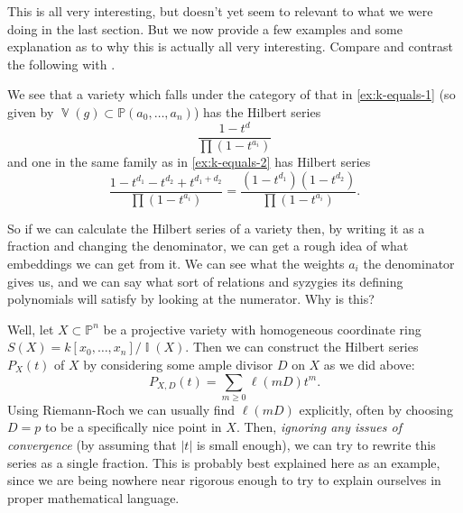 \documentclass[10pt,notitlepage]{article}
\numberwithin{equation}{subsection}
\DeclareMathOperator{\van}{\mathbb{V}}
\DeclareMathOperator{\ide}{\mathbb{I}}
\newcommand{\pee}{\mathbb{P}}
\newcommand{\pazn}{\pee(a_0,\ldots,a_n)}
\begin{document}
        This is all very interesting, but doesn't yet seem to relevant to what we were doing in the last section.
        But we now provide a few examples and some explanation as to why this is actually all very interesting.
        Compare and contrast the following with \cite[Proposition~4.3,~Example~4.4]{Reid:2002uy}.

        \begin{example}
            We see that a variety which falls under the category of that in \cref{ex:k-equals-1} (so given by $\van(g)\subset\pazn$) has the Hilbert series
            \[
                \frac{1-t^d}{\prod(1-t^{a_i})}
            \]
            and one in the same family as in \cref{ex:k-equals-2} has Hilbert series
            \[
                \frac{1-t^{d_1}-t^{d_2}+t^{d_1+d_2}}{\prod(1-t^{a_i})} = \frac{(1-t^{d_1})(1-t^{d_2})}{\prod(1-t^{a_i})}.
            \]
        \end{example}

        So if we can calculate the Hilbert series of a variety then, by writing it as a fraction and changing the denominator, we can get a rough idea of what embeddings we can get from it.
        We can see what the weights $a_i$ the denominator gives us, and we can say what sort of relations and syzygies its defining polynomials will satisfy by looking at the numerator.
        Why is this?

        Well, let $X\subset\pee^n$ be a projective variety with homogeneous coordinate ring $S(X)=k[x_0,\ldots,x_n]/\ide(X)$.
        Then we can construct the Hilbert series $P_X(t)$ of $X$ by considering some ample divisor $D$ on $X$ as we did above:
        \[
            P_{X,D}(t) = \sum_{m\geqslant0} \ell(mD)t^m.
        \]
        Using Riemann-Roch we can usually find $\ell(mD)$ explicitly, often by choosing $D=p$ to be a specifically nice point in $X$.
        Then, \emph{ignoring any issues of convergence} (by assuming that $|t|$ is small enough), we can try to rewrite this series as a single fraction.
        This is probably best explained here as an example, since we are being nowhere near rigorous enough to try to explain ourselves in proper mathematical language.
\end{document}
